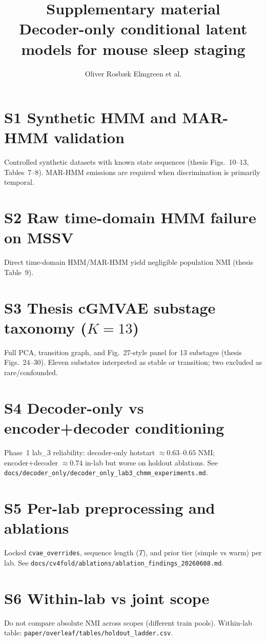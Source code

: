 \documentclass[10pt]{article}
\title{Supplementary material\\
\large Decoder-only conditional latent models for mouse sleep staging}
\author{Oliver Rosb\ae{}k Elmgreen et al.}
\date{}
\begin{document}
\maketitle

\section{S1 Synthetic HMM and MAR-HMM validation}
Controlled synthetic datasets with known state sequences (thesis Figs.~10--13, Tables~7--8).
MAR-HMM emissions are required when discrimination is primarily temporal.

\section{S2 Raw time-domain HMM failure on MSSV}
Direct time-domain HMM/MAR-HMM yield negligible population NMI (thesis Table~9).

\section{S3 Thesis cGMVAE substage taxonomy ($K{=}13$)}
Full PCA, transition graph, and Fig.~27-style panel for 13 substages (thesis Figs.~24--30).
Eleven substates interpreted as stable or transition; two excluded as rare/confounded.

\section{S4 Decoder-only vs encoder+decoder conditioning}
Phase~1 lab\_3 reliability: decoder-only hotstart $\approx 0.63$--$0.65$ NMI; encoder+decoder $\approx 0.74$ in-lab but worse on holdout ablations.
See \texttt{docs/decoder\_only/decoder\_only\_lab3\_chmm\_experiments.md}.

\section{S5 Per-lab preprocessing and ablations}
Locked \texttt{cvae\_overrides}, sequence length ($T$), and prior tier (simple vs warm) per lab.
See \texttt{docs/cv4fold/ablations/ablation\_findings\_20260608.md}.

\section{S6 Within-lab vs joint scope}
Do not compare absolute NMI across scopes (different train pools).
Within-lab table: \texttt{paper/overleaf/tables/holdout\_ladder.csv}.
\end{document}
